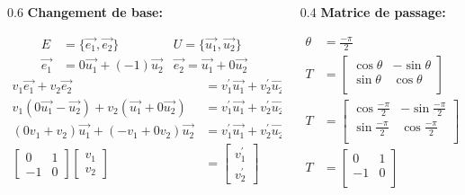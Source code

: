 \renewcommand{\e}{\vec{e_1}}
\newcommand{\ee}{\vec{e_2}}

\renewcommand{\u}{\vec{u_1}}
\newcommand{\uu}{\vec{u_2}}

\renewcommand{\v}{v_1}
\newcommand{\vv}{v_2}

\newcommand{\vp}{v_1^\prime}
\newcommand{\vvp}{v_2^\prime}
\newcommand{\hpi}{\frac{-\pi}{2}}


\begin{frame}
	\begin{columns}[t]
		\begin{column}{0.6\textwidth}
			\textbf{Changement de base:}
			\vspace{-.7cm}

			\footnotesize{\begin{align}
					E &= \{ \e, \ee \}
					&U = \{ \u, \uu \} \\
					\e &= 0\u + (-1)\uu
					&\ee = \u + 0\uu
			\end{align}
			\begin{align}
					\v\e + \vv\ee &= \vp\u + \vvp\uu \\
					\v(0\u - \uu) + \vv(\u + 0\uu) &= \vp\u + \vvp\uu \\
					(0\v + \vv)\u + (-\v + 0\vv)\uu &= \vp\u + \vvp\uu \\
					\begin{bmatrix} 0 & 1 \\ -1 & 0 \end{bmatrix}
					\begin{bmatrix} \v \\ \vv \end{bmatrix} &=
					\begin{bmatrix} \vp \\ \vvp \end{bmatrix}
			\end{align}}


		\end{column}
		\begin{column}{0.4\textwidth}
		\textbf{Matrice de passage:}

		\footnotesize{\begin{align}
		\theta &= \hpi \\
		T &= \begin{bmatrix}
						\cos\theta & -\sin\theta \\
						\sin\theta & \cos\theta \\
         \end{bmatrix} \\
		T &= \begin{bmatrix}
						\cos\hpi & -\sin\hpi \\
						\sin\hpi & \cos\hpi \\
         \end{bmatrix} \\
		T &= \begin{bmatrix}
						0 & 1 \\
						-1 & 0 \\
         \end{bmatrix}
		\end{align}}


\end{column}
\end{columns}
\end{frame}
